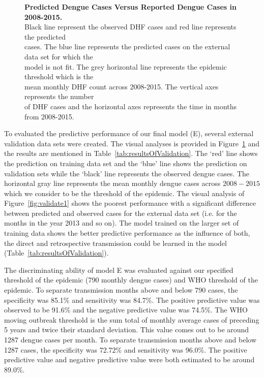 \documentclass{bmcart}
\begin{document}
\begin{figure}[htbp]
\begin{minipage}[c]{0.98\textwidth}
	\end{minipage}
	\caption{\textbf{Predicted Dengue Cases Versus Reported Dengue Cases in 2008-2015.}  \\ Black line represent the observed DHF cases and red line represents the predicted \\ cases. The blue line represents the predicted cases on the external data set for which  the \\ model is not fit. The grey horizontal line represents the epidemic threshold which is the \\ mean monthly DHF count across 2008-2015. The vertical axes represents the number \\ of DHF cases and the horizontal axes represents the time in months from 2008-2015.}
	\label{fig:validate}
\end{figure}

To evaluated the predictive performance of our final model (E), several external validation data sets were created.   The visual analyses is provided in Figure~\ref{fig:validate} and the results are mentioned in Table~\ref{tab:resultsOfValidation}. The `red' line shows the prediction on training data set and the `blue' line shows the prediction on validation sets while the `black' line represents the observed dengue cases. The horizontal gray line represents the mean monthly dengue cases across $2008-2015$ which we consider to be the threshold of the epidemic. The visual analysis of Figure~\ref{fig:validate1} shows the poorest performance with a significant difference between predicted and observed cases for the external data set (i.e. for the months in the year 2013 and so on). The model trained on the larger set of training data shows the better predictive performance as the influence of both, the direct and  retrospective transmission could be learned in the model (Table~\ref{tab:resultsOfValidation}).   


The discriminating ability of model E was evaluated against our specified threshold of the epidemic (790 monthly dengue cases) and WHO threshold of the epidemic. To separate transmission months above and below 790 cases, the specificity was 85.1\% and sensitivity was 84.7\%. The positive predictive value was observed to be 91.6\% and the negative predictive value was 74.5\%. The WHO moving outbreak threshold \cite{world2009dengue} is the sum total of monthly average cases of preceding 5 years and twice their standard deviation. This value comes out to be around 1287 dengue cases per month. To separate transmission months above and below 1287 cases, the specificity was 72.72\% and sensitivity was 96.0\%. The positive predictive value and negative predictive value were both estimated to be around 89.0\%.
\end{document}
